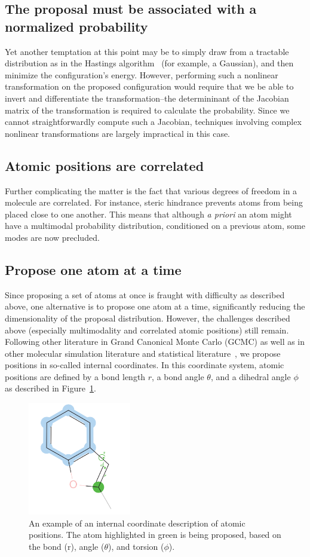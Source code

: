 \subsection{The proposal must be associated with a normalized probability}
%
Yet another temptation at this point may be to simply draw from a tractable distribution as in the Hastings algorithm~\cite{Hastings1970} (for example, a Gaussian), and then minimize the configuration's energy.
%
However, performing such a nonlinear transformation on the proposed configuration would require that we be able to invert and differentiate the transformation--the determininant of the Jacobian matrix of the transformation is required to calculate the probability.
%
Since we cannot straightforwardly compute such a Jacobian, techniques involving complex nonlinear transformations are largely impractical in this case.
%
\subsection{Atomic positions are correlated}
Further complicating the matter is the fact that various degrees of freedom in a molecule are correlated.
%
For instance, steric hindrance prevents atoms from being placed close to one another.
%
This means that although \emph{a priori} an atom might have a multimodal probability distribution, conditioned on a previous atom, some modes are now precluded.
%
\subsection{Propose one atom at a time}
%
Since proposing a set of atoms at once is fraught with difficulty as described above, one alternative is to propose one atom at a time, significantly reducing the dimensionality of the proposal distribution.
%
However, the challenges described above (especially multimodality and correlated atomic positions) still remain.
%
Following other literature in Grand Canonical Monte Carlo (GCMC) \cite{Siepmann1992} as well as in other molecular simulation literature and statistical literature~\cite{COMBE2003}, we propose positions in so-called internal coordinates.
%
In this coordinate system, atomic positions are defined by a bond length $r$, a bond angle $\theta$, and a dihedral angle $\phi$ as described in Figure~\ref{fig:internal}.
%
\begin{figure}
    \centering
    \includegraphics[width=0.4\textwidth]{internalcoords.png}
    \caption{An example of an internal coordinate description of atomic positions. The atom highlighted in green is being proposed, based on the bond (r), angle ($\theta$), and torsion ($\phi$).}
    \label{fig:internal}
\end{figure}
%
